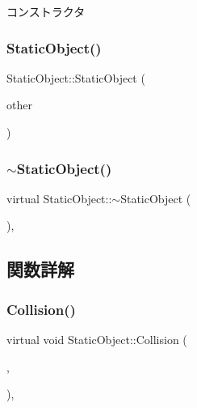 コンストラクタ 

\mbox{\label{class_static_object_a0e1518e656ce5ba408cb69f14ee3066b}} 
\subsubsection{\texorpdfstring{Static\+Object()}{StaticObject()}\hspace{0.1cm}{\footnotesize\ttfamily [2/2]}}
{\footnotesize\ttfamily Static\+Object\+::\+Static\+Object (\begin{DoxyParamCaption}\item[{const \mbox{\hyperlink{class_static_object}{Static\+Object}} \&}]{other }\end{DoxyParamCaption})\hspace{0.3cm}{\ttfamily [inline]}}

\mbox{\label{class_static_object_ac27301fc3d8d22aff5664f592c375cd8}} 
\subsubsection{\texorpdfstring{$\sim$\+Static\+Object()}{~StaticObject()}}
{\footnotesize\ttfamily virtual Static\+Object\+::$\sim$\+Static\+Object (\begin{DoxyParamCaption}{ }\end{DoxyParamCaption})\hspace{0.3cm}{\ttfamily [inline]}, {\ttfamily [virtual]}}



\subsection{関数詳解}
\mbox{\label{class_static_object_a64c8803ff881d578d103413e299dbf7f}} 
\subsubsection{\texorpdfstring{Collision()}{Collision()}}
{\footnotesize\ttfamily virtual void Static\+Object\+::\+Collision (\begin{DoxyParamCaption}\item[{\mbox{\hyperlink{class_object_base}{Object\+Base}} $\ast$}]{,  }\item[{\mbox{\hyperlink{common_8h_ae148fff5818e9444b4ab2288829559bf}{Vec2}}}]{ }\end{DoxyParamCaption})\hspace{0.3cm}{\ttfamily [inline]}, {\ttfamily [virtual]}}



